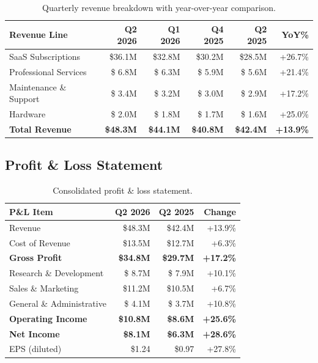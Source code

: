 \documentclass[
    language=english,
    doctype=quarterly-report,
    institution=none,
]{../../omnilatex}
\begin{document}
\begin{table}[h]
    \centering
    \begin{tabular}{lrrrrr}
        \toprule
        \textbf{Revenue Line} & \textbf{Q2 2026} & \textbf{Q1 2026} & \textbf{Q4 2025} & \textbf{Q2 2025} & \textbf{YoY\%} \\
        \midrule
        SaaS Subscriptions    & \$36.1M & \$32.8M & \$30.2M & \$28.5M & +26.7\% \\
        Professional Services  & \$ 6.8M & \$ 6.3M & \$ 5.9M & \$ 5.6M & +21.4\% \\
        Maintenance \& Support & \$ 3.4M & \$ 3.2M & \$ 3.0M & \$ 2.9M & +17.2\% \\
        Hardware               & \$ 2.0M & \$ 1.8M & \$ 1.7M & \$ 1.6M & +25.0\% \\
        \midrule
        \textbf{Total Revenue} & \textbf{\$48.3M} & \textbf{\$44.1M} & \textbf{\$40.8M} & \textbf{\$42.4M} & \textbf{+13.9\%} \\
        \bottomrule
    \end{tabular}
    \caption{Quarterly revenue breakdown with year-over-year comparison.}
\end{table}

\subsection{Profit \& Loss Statement}

\begin{table}[h]
    \centering
    \begin{tabular}{lrrr}
        \toprule
        \textbf{P\&L Item} & \textbf{Q2 2026} & \textbf{Q2 2025} & \textbf{Change} \\
        \midrule
        Revenue                      & \$48.3M & \$42.4M & +13.9\% \\
        Cost of Revenue              & \$13.5M & \$12.7M & +6.3\% \\
        \midrule
        \textbf{Gross Profit}        & \textbf{\$34.8M} & \textbf{\$29.7M} & \textbf{+17.2\%} \\
        \midrule
        Research \& Development      & \$ 8.7M & \$ 7.9M & +10.1\% \\
        Sales \& Marketing           & \$11.2M & \$10.5M & +6.7\% \\
        General \& Administrative    & \$ 4.1M & \$ 3.7M & +10.8\% \\
        \midrule
        \textbf{Operating Income}    & \textbf{\$10.8M} & \textbf{\$8.6M} & \textbf{+25.6\%} \\
        \midrule
        \textbf{Net Income}          & \textbf{\$8.1M} & \textbf{\$6.3M} & \textbf{+28.6\%} \\
        EPS (diluted)                & \$1.24   & \$0.97   & +27.8\% \\
        \bottomrule
    \end{tabular}
    \caption{Consolidated profit \& loss statement.}
\end{table}
\end{document}
